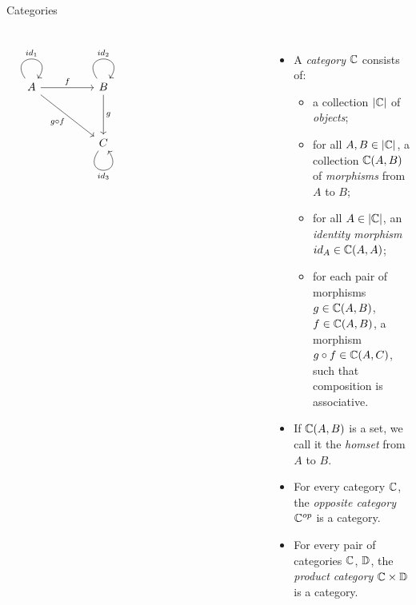 \begin{frame}[fragile]{Categories}
\begin{columns}
\[\begin{tikzcd}
	A && B \\
	\\
	&& C &&&&& {}
	\arrow["{id_1}", from=1-1, to=1-1, loop, in=55, out=125, distance=10mm]
	\arrow["f", from=1-1, to=1-3]
	\arrow["{g \circ f}"', from=1-1, to=3-3]
	\arrow["{id_2}", from=1-3, to=1-3, loop, in=55, out=125, distance=10mm]
	\arrow["g", from=1-3, to=3-3]
	\arrow["{id_3}"', from=3-3, to=3-3, loop, in=305, out=235, distance=10mm]
\end{tikzcd}\]
\begin{itemize}
 \item
A \textit{category} $\mathbb{C}$ consists of:
\begin{itemize}
 \pause\item a collection $|\mathbb{C}|$ of \textit{objects};
 \pause\item for all $A, B \in |\mathbb{C}|$, a collection $\mathbb{C}(A, B)$ of \textit{morphisms} from $A$ to $B$;
 \pause\item for all $A \in |\mathbb{C}|$, an \textit{identity morphism} $id_A \in \mathbb{C}(A, A)$;
 \pause\item for each pair of morphisms $g \in \mathbb{C}(A,B)$, $f \in \mathbb{C}(A,B)$, a morphism $g \circ f \in \mathbb{C}(A,C)$, such that composition is associative.
\end{itemize}
\pause\item If $\mathbb{C}(A, B)$ is a set, we call it the \textit{homset} from $A$ to $B$.
\pause\item For every category $\mathbb{C}$, the \textit{opposite category} $\mathbb{C}^{op}$ is a category.
\pause\item For every pair of categories $\mathbb{C}$, $\mathbb{D}$, the \textit{product category} $\mathbb{C} \times \mathbb{D}$ is a category.
\end{itemize}
\end{columns}
\end{frame}
